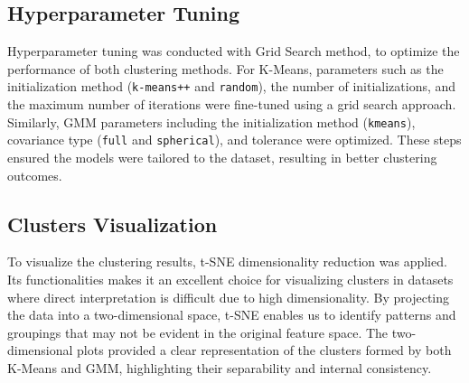     \subsection{Hyperparameter Tuning}
    
        Hyperparameter tuning was conducted with Grid Search method, to optimize the performance of both clustering methods. For K-Means, parameters such as the initialization method (\texttt{k-means++} and \texttt{random}), the number of initializations, and the maximum number of iterations were fine-tuned using a grid search approach. Similarly, GMM parameters including the initialization method (\texttt{kmeans}), covariance type (\texttt{full} and \texttt{spherical}), and tolerance were optimized. These steps ensured the models were tailored to the dataset, resulting in better clustering outcomes.

    \subsection{Clusters Visualization}
    
        To visualize the clustering results, t-SNE dimensionality reduction was applied. Its functionalities makes it an excellent choice for visualizing clusters in datasets where direct interpretation is difficult due to high dimensionality. By projecting the data into a two-dimensional space, t-SNE enables us to identify patterns and groupings that may not be evident in the original feature space. The two-dimensional plots provided a clear representation of the clusters formed by both K-Means and GMM, highlighting their separability and internal consistency.
        
